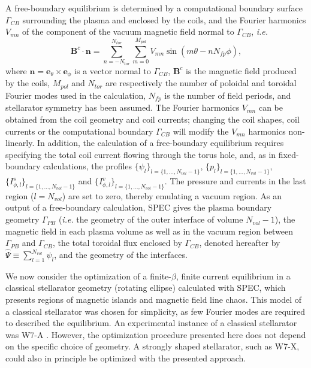 A free-boundary equilibrium is determined by a computational boundary surface $\Gamma_{CB}$ surrounding the plasma and enclosed by the coils, and the Fourier harmonics $V_{mn}$ of the component of the vacuum magnetic field normal to $\Gamma_{CB}$, \textit{i.e.}
\begin{equation}
    \mathbf{B}^c\cdot\mathbf{n} = \sum_{n=-N_{tor}}^{N_{tor}}\sum_{m=0}^{M_{pol}} V_{mn} \sin(m\theta-nN_{fp}\phi),
\end{equation}
where $\mathbf{n}=\mathbf{e}_\theta\times \mathbf{e}_\phi$ is a vector normal to $\Gamma_{CB}$, $\mathbf{B}^c$ is the magnetic field produced by the coils, $M_{pol}$ and $N_{tor}$ are respectively the number of poloidal and toroidal Fourier modes used in the calculation, $N_{fp}$ is the number of field periods, and stellarator symmetry has been assumed. The Fourier harmonics $V_{mn}$ can be obtained from the coil geometry and coil currents; changing the coil shapes, coil currents or the computational boundary $\Gamma_{CB}$ will modify the $V_{mn}$ harmonics non-linearly. In addition, the calculation of a free-boundary equilibrium requires specifying the total coil current flowing through the torus hole, and, as in fixed-boundary calculations, the profiles $\{\psi_{l}\}_{l=\{1,\ldots,N_{vol}-1\}}$,  $\{p_l\}_{l=\{1,\ldots,N_{vol}-1\}}$,  $\{I^s_{\phi,l}\}_{l=\{1,\ldots,N_{vol}-1\}}$ and $\{I^v_{\phi,l}\}_{l=\{1,\ldots,N_{vol}-1\}}$. The pressure and currents in the last region ($l=N_{vol}$) are set to zero, thereby emulating a vacuum region.  As an output of a free-boundary calculation, SPEC gives the plasma boundary geometry $\Gamma_{PB}$ (\textit{i.e.} the geometry of the outer interface of volume $N_{vol}-1$), the magnetic field in each plasma volume as well as in the vacuum region between $\Gamma_{PB}$ and $\Gamma_{CB}$, the total toroidal flux enclosed by $\Gamma_{CB}$, denoted hereafter by $\widehat\Psi\equiv\sum_{l=1}^{N_{vol}} \psi_l$, and the geometry of the interfaces.

We now consider the optimization of a finite-$\beta$, finite current equilibrium in a classical stellarator geometry (rotating ellipse) calculated with \ac{SPEC}, which presents regions of magnetic islands and magnetic field line chaos. This model of a classical stellarator was chosen for simplicity, as few Fourier modes are required to described the equilibrium. An experimental instance of a classical stellarator was \ac{W7-A} \cite{Grieger1985}. However, the optimization procedure presented here does not depend on the specific choice of geometry. A strongly shaped stellarator, such as \ac{W7-X}, could also in principle be optimized with the presented approach.

